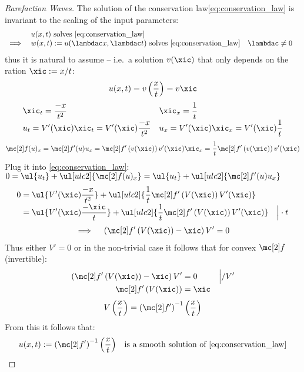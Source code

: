 \begin{proofbox}\nospacing
    \begin{proof}[Rarefaction Waves]\label{proof:rarefaction_waves}
        The solution of the conservation law\cref{eq:conservation_law} is invariant to the scaling of the input parameters:
        \begin{align*}
          &&&u(x,t)\text{ solves \cref{eq:conservation_law}}\\[-1\jot]
          &\implies&&w(x,t):=u(\lambdac x,\lambdac t)\text{ solves \cref{eq:conservation_law}}&&\lambdac\neq0
        \end{align*}
        thus it is natural to assume  -- i.e.\ a solution $v(\xic)$ that only depends on the ration $\xic:=x/t$:
        \begin{align*}
          u(x,t)=v \left(\frac{x}{t}\right)=v{\xic}
        \end{align*}
        \begin{align*}
          &\xic_{t}=\frac{-x}{t^{2}}&&\xic_{x}=\frac{1}{t} \\[-1\jot]
          &u_{t}=V'(\xic)\xic_{t}=V'(\xic)\frac{-x}{t^{2}}&&u_{x}=V'(\xic)\xic_{x}=V'(\xic)\frac{1}{t}
        \end{align*}
        \begin{align*}
          \flux(u)_{x}=\flux'(u)u_{x}=\flux' \left(v(\xic)\right)v'(\xic)\xic_{x}
          =\frac{1}{t}\flux' \left(v(\xic)\right)v'(\xic)
        \end{align*}
        Plug it into \cref{eq:conservation_law}:\hfil $0=\ul{u_{t}}+\ul[ulc2]{\flux(u)_{x}}=\ul{u_{t}}+\ul[ulc2]{\flux'(u) u_{x}}$
        \begin{align*}
          0&=\ul{V'(\xic)\frac{-x}{t^{2}}}+\ul[ulc2]{\frac{1}{t}\flux'\left(V(\xic)\right)V'(\xic)} \\[-1\jot]
          &=\ul{V'(\xic)\frac{-\xic}{t}}+\ul[ulc2]{\frac{1}{t}\flux'\left(V(\xic)\right)V'(\xic)}&\Big|\cdot t
        \end{align*}
        \begin{align*}
          \implies\quad\left(\flux' \left(V(\xic)\right)-\xic\right)V'=0
        \end{align*}
        Thus either $V'=0$ or in the non-trivial case it follows that for convex $\flux$ (invertible):
        \begin{align*}
          \left(\flux' \left(V(\xic)\right)-\xic\right)V'&=0&&\Big|/V' \\[-1\jot]
          \flux' \left(V(\xic)\right)&=\xic
        \end{align*}
        \begin{align}
          V \left(\frac{x}{t}\right)=\left(\flux'\right)^{-1}\left(\frac{x}{t}\right)
        \end{align}
        From this it follows that:
        \begin{align*}
          u(x,t):=\left(\flux'\right)^{-1}\left(\frac{x}{t}\right) &&\text{is a smooth solution of \cref{eq:conservation_law}}
        \end{align*}
    \end{proof}
\end{proofbox}

